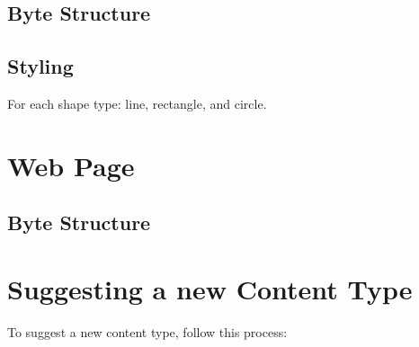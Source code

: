 \documentclass{report}
\begin{document}
\subsection{Byte Structure}
\subsection{Styling}
For each shape type: line, rectangle, and circle.
\section{Web Page}
\subsection{Byte Structure}
\section{Suggesting a new Content Type}
To suggest a new content type, follow this process:
\end{document}
